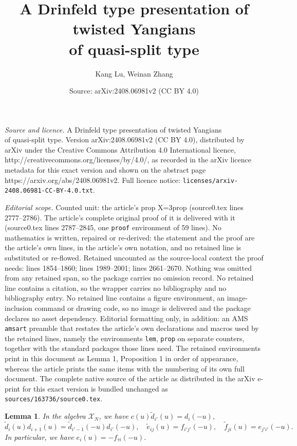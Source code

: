 \documentclass[10pt,a4paper]{amsart}
\title{A Drinfeld type presentation of twisted Yangians\\ of quasi-split type}
\author{Kang Lu, Weinan Zhang}
\date{Source: arXiv:2408.06981v2 (CC BY 4.0)}
\newtheorem{lem}{Lemma}
\newcommand{\beq}{\begin{equation}}
\newcommand{\eeq}{\end{equation}}
\newcommand{\scrX}{{\mathscr{X}}}
\newcommand{\tl}{\tilde}
\begin{document}
\maketitle

\noindent\emph{Source and licence.} A Drinfeld type presentation of twisted Yangians\\ of quasi-split type. Version arXiv:2408.06981v2 (CC BY 4.0), distributed by arXiv under the Creative Commons Attribution 4.0 International licence, http://creativecommons.org/licenses/by/4.0/, as recorded in the arXiv licence metadata for this exact version and shown on the abstract page https://arxiv.org/abs/2408.06981v2. Full licence notice: \texttt{licenses/arxiv-2408.06981-CC-BY-4.0.txt}.\par\smallskip

\noindent\textit{Editorial scope.} Counted unit: the article's prop X=3prop (source0.tex lines 2777--2786). The article's complete original proof of it is delivered with it (source0.tex lines 2787--2845, one \texttt{proof} environment of 59 lines). No mathematics is written, repaired or re-derived: the statement and the proof are the article's own lines, in the article's own notation, and no retained line is substituted or re-flowed.  Retained uncounted as the source-local context the proof needs: lines 1854--1860; lines 1989--2001; lines 2661--2670.  Nothing was omitted from any retained span, so the package carries no omission record.  No retained line contains a citation, so the wrapper carries no bibliography and no bibliography entry.  No retained line contains a figure environment, an image-inclusion command or drawing code, so no image is delivered and the package declares no asset dependency.  Editorial formatting only, in addition: an AMS \texttt{amsart} preamble that restates the article's own declarations and macros used by the retained lines, namely the environments \texttt{lem}, \texttt{prop} on separate counters, together with the standard packages those lines need.  The retained environments print in this document as Lemma 1, Proposition 1 in order of appearance, whereas the article prints the same items with the numbering of its own full document.  The complete native source of the article as distributed in the arXiv e-print for this exact version is bundled unchanged as \texttt{sources/163736/source0.tex}.
\begin{lem}\label{efaiii}
In the algebra $\scrX_N$, we have $c(u)\tl d_{i'}(u)=d_{i}(-u)$,
\beq\label{efd}
\tl d_i(u)d_{i+1}(u)=\tl d_{i'-1}(-u)d_{i'}(-u),\quad  \tl e_{ij}(u)=f_{i'j'}(-u), \quad  \tl f_{ji}(u)=e_{j'i'}(-u).
\eeq
In particular, we have $e_{i}(u)=-f_{\tau i}(-u)$.
\end{lem}
\end{document}
